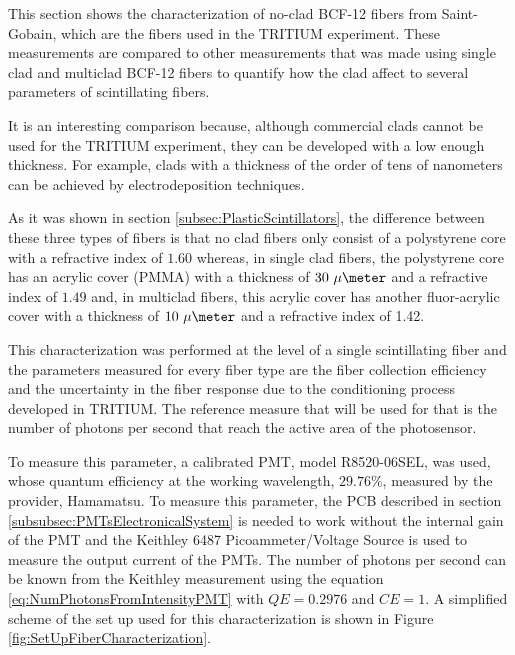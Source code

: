 This section shows the characterization of no-clad BCF-12 fibers from Saint-Gobain, which are the fibers used in the TRITIUM experiment. These measurements are compared to other measurements that was made using single clad and multiclad BCF-12 fibers to quantify how the clad affect to several parameters of scintillating fibers.

It is an interesting comparison because, although commercial clads cannot be used for the TRITIUM experiment, they can be developed with a low enough thickness. For example, clads with a thickness of the order of tens of nanometers can be achieved by electrodeposition techniques.

As it was shown in section \ref{subsec:PlasticScintillators}, the difference between these three types of fibers is that no clad fibers only consist of a polystyrene core with a refractive index of $1.60$ whereas, in single clad fibers, the polystyrene core has an acrylic cover (PMMA) with a thickness of $30~\mu\meter$ and a refractive index of $1.49$ and, in multiclad fibers, this acrylic cover has another fluor-acrylic cover with a thickness of $10~\mu\meter$ and a refractive index of 1.42.




This characterization was performed at the level of a single scintillating fiber and the parameters measured for every fiber type are the fiber collection efficiency and the uncertainty in the fiber response due to the conditioning process developed in TRITIUM. The reference measure that will be used for that is the number of photons per second that reach the active area of the photosensor.

To measure this parameter, a calibrated PMT, model R8520-06SEL, was used, whose quantum efficiency at the working wavelength, $29.76\%$, measured by the provider, Hamamatsu. To measure this parameter, the PCB described in section \ref{subsubsec:PMTsElectronicalSystem} is needed to work without the internal gain of the PMT and the Keithley 6487 Picoammeter/Voltage Source is used to measure the output current of the PMTs. The number of photons per second can be known from the Keithley measurement using the equation \ref{eq:NumPhotonsFromIntensityPMT} with $QE=0.2976$ and $CE=1$. A simplified scheme of the set up used for this characterization is shown in Figure \ref{fig:SetUpFiberCharacterization}.


